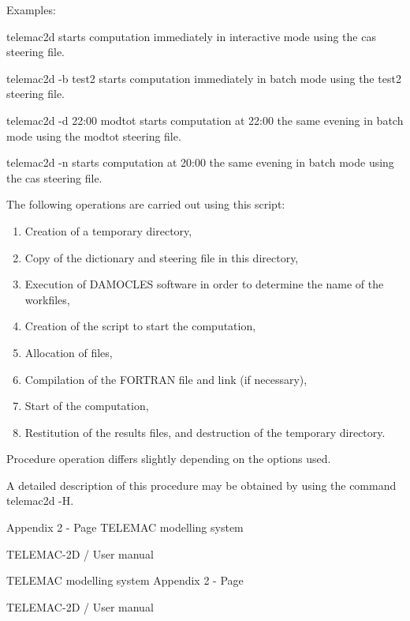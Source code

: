  Examples:

 telemac2d starts computation immediately in interactive mode using the cas steering file.

 telemac2d -b test2 starts computation immediately in batch mode using the test2 steering file.

 telemac2d -d 22:00 modtot starts computation at 22:00 the same evening in batch mode using the modtot steering file.

 telemac2d -n starts computation at 20:00 the same evening in batch mode using the cas steering file.



 The following operations are carried out using this script:

\begin{enumerate}
\item  Creation of a temporary directory,

\item  Copy of the dictionary and steering file in this directory,

\item  Execution of DAMOCLES software in order to determine the name of the workfiles,

\item  Creation of the script to start the computation,

\item  Allocation of files,

\item  Compilation of the FORTRAN file and link (if necessary),

\item  Start of the computation,

\item  Restitution of the results files, and destruction of the temporary directory.
\end{enumerate}



 Procedure operation differs slightly depending on the options used.

 A detailed description of this procedure may be obtained by using the command telemac2d -H.

 Appendix 2 - Page   TELEMAC modelling system

 TELEMAC-2D / User manual



 TELEMAC modelling system Appendix 2 - Page

 TELEMAC-2D / User manual



